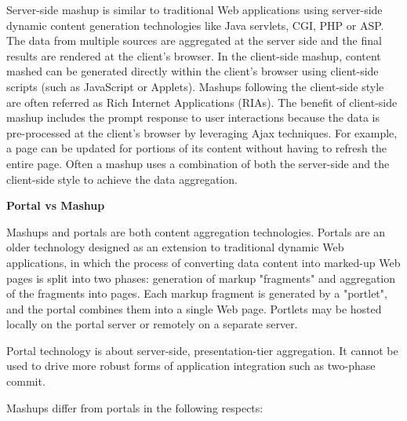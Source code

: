 	 Server-side mashup is similar to traditional Web applications using server-side dynamic content generation technologies like Java servlets, CGI, PHP or ASP. The data from multiple sources are aggregated at the server side and the final results are rendered at the client’s browser. In the client-side mashup, content mashed can be generated directly within the client’s browser using client-side scripts (such as JavaScript or Applets). Mashups following the client-side style are often referred as Rich Internet Applications (RIAs). The benefit of client-side mashup includes the prompt response to user interactions because the data is pre-processed at the client’s browser by leveraging Ajax techniques. For example, a page can be updated for portions of its content without having to refresh the entire page. Often a mashup uses a combination of both the server-side and the client-side style to achieve the data aggregation\cite{bolin2005end}.

        \textbf{Portal vs Mashup}

		Mashups and portals are both content aggregation technologies. Portals are an older technology designed as an extension to traditional dynamic Web applications, in which the process of converting data content into marked-up Web pages is split into two phases: generation of markup "fragments" and aggregation of the fragments into pages. Each markup fragment is generated by a "portlet", and the portal combines them into a single Web page. Portlets may be hosted locally on the portal server or remotely on a separate server.

		Portal technology is about server-side, presentation-tier aggregation. It cannot be used to drive more robust forms of application integration such as two-phase commit.

		Mashups differ from portals in the following respects:

